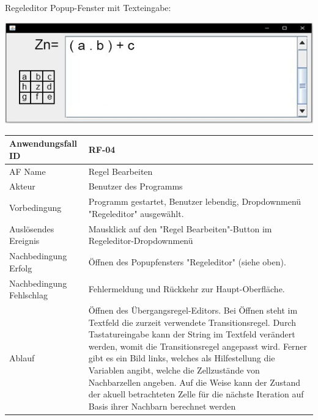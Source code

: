 \documentclass[11pt]{article}
\begin{document}
    \pagebreak
    \par
    Regeleditor Popup-Fenster mit Texteingabe:
    \par
    \includegraphics[width=15cm]{regedit}
    \par
    \begin{tabular}[m]{|m{5cm}|m{11cm}|}
        \hline
        Anwendungsfall ID     & RF-04 \\ %
        \hline
        AF Name     &  Regel Bearbeiten \\
        \hline
        Akteur&Benutzer des Programms \\
        \hline
        Vorbedingung&Programm gestartet, Benutzer lebendig, Dropdownmenü "Regeleditor" ausgewählt.\\
        \hline
        Auslösendes Ereignis&Mausklick auf den "Regel Bearbeiten"-Button im Regeleditor-Dropdownmenü\\
        \hline
        Nachbedingung Erfolg&Öffnen des Popupfensters "Regeleditor" (siehe oben).\\
        \hline
        Nachbedingung Fehlschlag&Fehlermeldung und Rückkehr zur Haupt-Oberfläche.\\
        \hline
        Ablauf&Öffnen des Übergangsregel-Editors. Bei Öffnen steht im Textfeld die zurzeit verwendete Transitionsregel. Durch Tastatureingabe kann der String im Textfeld verändert werden, womit die Transitionsregel angepasst wird. Ferner gibt es ein Bild links, welches als Hilfestellung die Variablen angibt, welche die Zellzustände von Nachbarzellen angeben. Auf die Weise kann der Zustand der akuell betrachteten Zelle für die nächste Iteration auf Basis ihrer Nachbarn berechnet werden\\
        \hline
    \end{tabular}
    \par
\subsubsection{}
\end{document}
